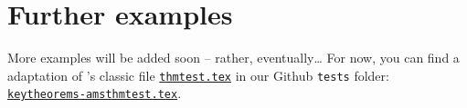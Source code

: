 \documentclass{ltxdoc}
\begin{document}
\section{Further examples}

More examples will be added soon -- rather, eventually\dots{} For now, you can find a  adaptation of 's classic file \href{https://mirrors.ctan.org/macros/latex/required/amscls/doc/thmtest.tex}{\texttt{thmtest.tex}} in our Github \texttt{tests} folder: \href{https://github.com/mbertucci47/keytheorems/blob/main/tests/keytheorems-amsthmtest.tex}{\texttt{keytheorems-amsthmtest.tex}}.


\printindex
\end{document}
